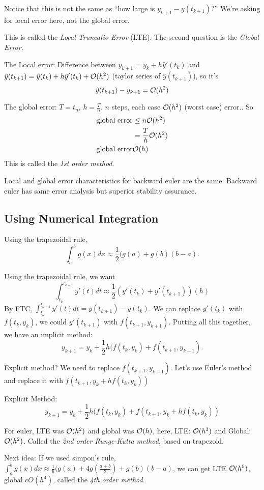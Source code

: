 Notice that this is not the same as ``how large is $y_{k+1} -
y(t_{k+1})$?'' We're asking for local error here, not the global
error.

This is called the \emph{Local Truncatio Error} (LTE).
The second question is the \emph{Global Error}.

The Local error:
Difference between $y_{k+1} = y_k + h \hat y'(t_k)$ and $\hat y(t_{k+1}) = \hat y(t_k) +
h \hat y'(t_k) + \mathcal{O}(h^2)$ (taylor series of $\hat y(t_{k+1})$), so
it's 
$$\hat y(t_{k+1}) - y_{k+1} =\mathcal{O}(h^2)$$

The global error: $T = t_n$, $h=\frac{T}{n}$. $n$ steps, each case
$\mathcal{O}(h^2)$ (worst case) error..
So 
\begin{align*}
\text{global error} &\le n\mathcal{O}(h^2)\\
&= \frac{T}{h}\mathcal{O}(h^2)\\  
\text{global error} &\mathcal{O}(h)\\
\end{align*}
This is called the \emph{1st order method}.

Local and global error characteristics for backward euler are the
same.
Backward euler has same error analysis but superior stability
assurance.

\subsection{Using Numerical Integration}
Using the trapezoidal rule, 
$$\int_a^b g(x)dx \approx \frac{1}{2}(g(a)+g(b)(b-a).$$

Using the trapezoidal rule, we want $$\int_{t_k}^{t_{k+1}}y'(t)dt \approx \frac{1}{2}(y'(t_k) + y'(t_{k+1}))(h)$$
By FTC, $\int_{t_k}^{t_{k+1}}y'(t)dt = y(t_{k+1}) - y(t_k)$. We can replace $y'(t_k)$  with $f(t_k,y_k)$, we could $y'(t_{k+1})$
with $f(t_{k+1}, y_{k+1})$. Putting all this together, we have an implicit method: $$y_{k+1}
= y_k + \frac{1}{2}h(f(t_k, y_k) + f(t_{k+1}, y_{k+1}).$$

Explicit method? We need to replace $f(t_{k+1}, y_{k+1})$. Let's use
Euler's method and replace it with $f(t_{k+1}, y_k + hf(t_k, y_k))$

Explicit Method: $$y_{k+1}= y_k + \frac{1}{2}h(f(t_k, y_k) +
f(t_{k+1}, y_k + hf(t_k, y_k))$$

 For euler, LTE was $\mathcal{O}(h^2)$ and global was
$\mathcal{O}(h)$, here, LTE: $\mathcal{O}(h^3)$ and Global: $\mathcal{O}(h^2)$. Called the \emph{2nd
order Runge-Kutta method}, based on trapezoid. 

Next idea: If we used simpon's rule, $\int_a^b g(x)dx \approx \frac{1}{6}(g(a)+4g(\frac{a+b}{2})+g(b)(b-a)$, we can get LTE $\mathcal{O}(h^5)$, global
$cO(h^4)$, called the \emph{4th order method}.



